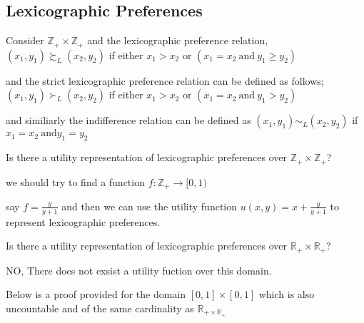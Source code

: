 \documentclass[12pt,a4paper,fleqn]{article}
\begin{document}
 \subsection{Lexicographic Preferences} 

Consider \(\mathbb{Z}_{+} \times \mathbb{Z}_{+}\) and the lexicographic preference relation,
\(\left( x_{1},y_{1} \right) \succsim_{L} \left( x_{2},y_{2} \right)  \)   if either \(x_{1}>x_{2}\) or  \(\left( x_{1}=x_{2} \ \text{and} \ y_{1} \geq y_{2} \right) \) 

and the strict lexicographic preference relation can be defined as follows;
\(\left( x_{1},y_{1} \right) \succ_{L} \left( x_{2},y_{2} \right)  \) if either \(x_{1}>x_{2}\) or \(\left( x_{1}=x_{2} \ \text{and} \ y_{1}>y_{2} \right) \)  

and similiarly the indifference relation can be defined as \(\left( x_{1},y_{1} \right) \sim_{L} \left( x_{2},y_{2} \right)  \) if \(x_{1}=x_{2} \ \text{and} y_{1}=y_{2}\)    

Is there a utility representation of lexicographic preferences over \(\mathbb{Z}_{+} \times \mathbb{Z}_{+}\)?   

we should try to find a function \(f: \mathbb{Z}_{+} \to [0,1) \)  

say \(f=\frac{y}{y+1}\) and then we can use the utility function \(u(x,y)=x+\frac{y}{y+1}\) to represent lexicographic preferences.   

Is there a utility representation of lexicographic preferences over \(\mathbb{R}_{+} \times \mathbb{R}_{+}\)? 

NO, There does not exsist a utility fuction over this domain.

Below is a proof provided for the domain \([0,1] \times [0,1]\) which is also uncountable and of the same cardinality as \(\mathbb{R}_{+ \times \mathbb{R}_{+}}\)   
\end{document}
